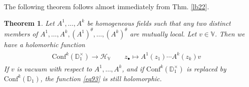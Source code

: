 \documentclass[12pt,b5paper,notitlepage]{article}
\theoremstyle{definition}
\theoremstyle{plain}
\newtheorem{thm}[df]{Theorem}
\newcommand{\mc}{\mathcal}
\newcommand{\Conf}{\mathrm{Conf}}
\newcommand{\blt}{\bullet}
\newcommand{\Vbb}{\mathbb V}
\newcommand{\Dbb}{\mathbb D}
\numberwithin{equation}{section}
\begin{document}
The following theorem follows almost immediately from Thm. \ref{lb22}.

\begin{thm}\label{lb45}
Let $A^1,\dots,A^k$ be homogeneous fields such that any two distinct members of $A^1,\dots,A^k,(A^1)^\theta,\dots,(A^k)^\theta$ are mutually local. Let $v\in\Vbb$. Then we have a holomorhic function
\begin{gather}\label{eq93}
\begin{gathered}
\Conf^k(\Dbb^\times_1)\rightarrow \mc H_\Vbb\qquad z_\blt\mapsto A^1(z_1)\cdots A^k(z_k)v
\end{gathered}
\end{gather}
If $v$ is vacuum with respect to $A^1,\dots,A^k$, and if $\Conf^k(\Dbb^\times_1)$ is replaced by $\Conf^k(\Dbb_1)$, the function \eqref{eq93} is still holomorphic.
\end{thm}
\end{document}

